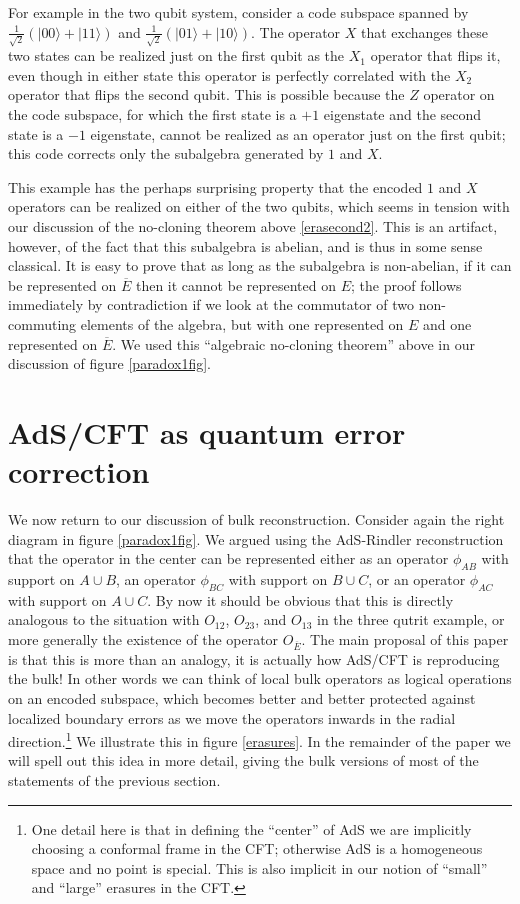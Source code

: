 \documentclass[12pt]{article}
\newcommand{\ran}{\rangle}
\newcommand{\ol}{\overline}
\begin{document}
For example in the two qubit system, consider a code subspace spanned by $\frac{1}{\sqrt{2}}\left(|00\ran+|11\ran\right)$ and $\frac{1}{\sqrt{2}}\left(|01\ran+|10\ran\right)$.  The operator $X$ that exchanges these two states can be realized just on the first qubit as the $X_1$ operator that flips it, even though in either state this operator is perfectly correlated with the $X_2$ operator that flips the second qubit.  This is possible because the $Z$ operator on the code subspace, for which the first state is a $+1$ eigenstate and the second state is a $-1$ eigenstate, cannot be realized as an operator just on the first qubit; this code corrects only the subalgebra generated by $1$ and $X$.  

This example has the perhaps surprising property that the encoded $1$ and $X$ operators can be realized on either of the two qubits, which seems in tension with our discussion of the no-cloning theorem above \eqref{erasecond2}.  This is an artifact, however, of the fact that this subalgebra is abelian, and is thus in some sense classical.  It is easy to prove that as long as the subalgebra is non-abelian, if it can be represented on $\ol{E}$ then it cannot be represented on $E$; the proof follows immediately by contradiction if we look at the commutator of two non-commuting elements of the algebra, but with one represented on $E$ and one represented on $\ol{E}$.  We used this ``algebraic no-cloning theorem'' above in our discussion of figure \ref{paradox1fig}.

\section{AdS/CFT as quantum error correction}\label{adssec}

We now return to our discussion of bulk reconstruction.  Consider again the right diagram in figure \ref{paradox1fig}.  We argued using the AdS-Rindler reconstruction that the operator in the center can be represented either as an operator $\phi_{AB}$ with support on $A\cup B$, an operator $\phi_{BC}$ with support on $B\cup C$, or an operator $\phi_{AC}$ with support on $A \cup C$.  By now it should be obvious that this is directly analogous to the situation with $O_{12}$, $O_{23}$, and $O_{13}$ in the three qutrit example, or more generally the existence of the operator $O_{\ol{E}}$.  The main proposal of this paper is that this is more than an analogy, it is actually how AdS/CFT is reproducing the bulk!  In other words we can think of local bulk operators as logical operations on an encoded subspace, which becomes better and better protected against localized boundary errors as we move the operators inwards in the radial direction.\footnote{One detail here is that in defining the ``center'' of AdS we are implicitly choosing a conformal frame in the CFT; otherwise AdS is a homogeneous space and no point is special.  This is also implicit in our notion of ``small'' and ``large'' erasures in the CFT.}  We illustrate this in figure \ref{erasures}.  In the remainder of the paper we will spell out this idea in more detail, giving the bulk versions of most of the statements of the previous section.  
\end{document}

